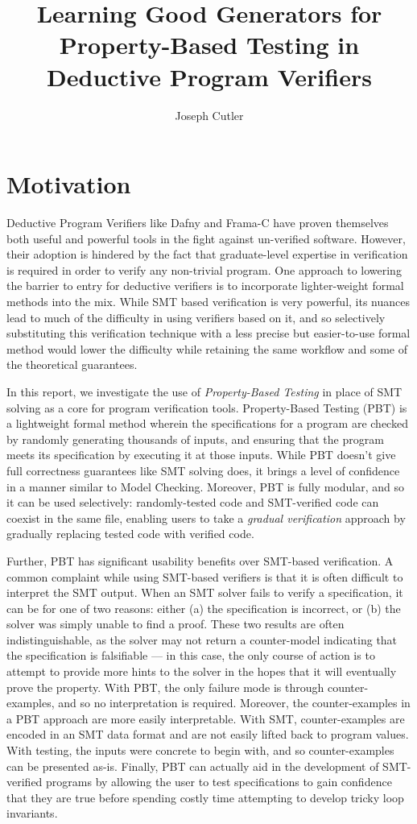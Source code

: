 \documentclass[10pt,a4paper]{article}
\title{Learning Good Generators for Property-Based Testing in Deductive Program Verifiers}
\author{Joseph Cutler}
\begin{document}
\maketitle

\section{Motivation}
Deductive Program Verifiers like Dafny and Frama-C have proven themselves both useful and powerful tools in the fight against un-verified software.
However, their adoption is hindered by the fact that graduate-level expertise in verification is required in order to verify any non-trivial program. One approach to lowering the barrier to entry for deductive verifiers is to incorporate lighter-weight formal methods into the mix. While SMT based verification is very powerful, its nuances lead to much of the difficulty in using verifiers based on it, and so selectively substituting this verification technique with a less precise but easier-to-use formal method would lower the difficulty while retaining the same workflow and some of the theoretical guarantees.

In this report, we investigate the use of \textit{Property-Based Testing} in place of SMT solving as a core for program verification tools. Property-Based Testing (PBT) \cite{qc} is a lightweight formal method wherein the specifications for a program are checked by randomly generating thousands of inputs, and ensuring that the program meets its specification by executing it at those inputs. While PBT doesn't give full correctness guarantees like SMT solving does, it brings a level of confidence in a manner similar to Model Checking. Moreover, PBT is fully modular, and so it can be used selectively: randomly-tested code and SMT-verified code can coexist in the same file, enabling users to take a \textit{gradual verification} approach by gradually replacing tested code with verified code.

Further, PBT has significant usability benefits over SMT-based verification. A common complaint while using SMT-based verifiers is that it is often difficult to interpret the SMT output. When an SMT solver fails to verify a specification, it can be for one of two reasons: either (a) the specification is incorrect, or (b) the solver was simply unable to find a proof. These two results are often indistinguishable, as the solver may not return a counter-model indicating that the specification is falsifiable --- in this case, the only course of action is to attempt to provide more hints to the solver in the hopes that it will eventually prove the property. With PBT, the only failure mode is through counter-examples, and so no interpretation is required. Moreover, the counter-examples in a PBT approach are more easily interpretable. With SMT, counter-examples are encoded in an SMT data format and are not easily lifted back to program values. With testing, the inputs were concrete to begin with, and so counter-examples can be presented as-is. Finally, PBT can actually aid in the development of SMT-verified programs by allowing the user to test specifications to gain confidence that they are true before spending costly time attempting to develop tricky loop invariants.
\end{document}
